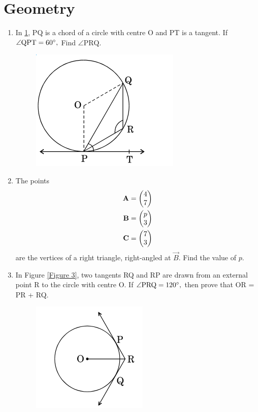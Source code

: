 \documentclass[10pt,-letter paper]{article}
\begin{document}
\section{Geometry}
\begin{enumerate}
\item In \ref{Figure 2}, PQ is a chord of a circle with centre O and PT is a tangent. If $\angle \text{QPT} = 60 \degree,$ Find $\angle \text{PRQ} $.
\begin{figure}[h!]
	\centering
    \includegraphics[width=0.5\columnwidth]{./figs/image2.png}
	\caption{}
	\label{Figure 2}
\end{figure}
\item The points 
\begin{align*}
 \mathbf{A}&= \begin{pmatrix}4 \\ 7\end{pmatrix}\\  
 \mathbf{B}&=\begin{pmatrix}p \\ 3\end{pmatrix}\\  
 \mathbf{C}&=\begin{pmatrix}7 \\ 3\end{pmatrix}
\end{align*}
are the vertices of a right triangle, right-angled at $ \vec{B} $. Find the value of $p$.
\item In Figure \ref{Figure 3}, two tangents RQ and RP are drawn from an external point R to the circle with centre O. If $\angle \text{PRQ} = 120 \degree,$ then prove that OR = PR + RQ.
  \begin{figure}[h!]
	\centering
    \includegraphics[width=0.5\columnwidth]{./figs/image3.png}

\end{figure}
\end{enumerate}
\end{document}
